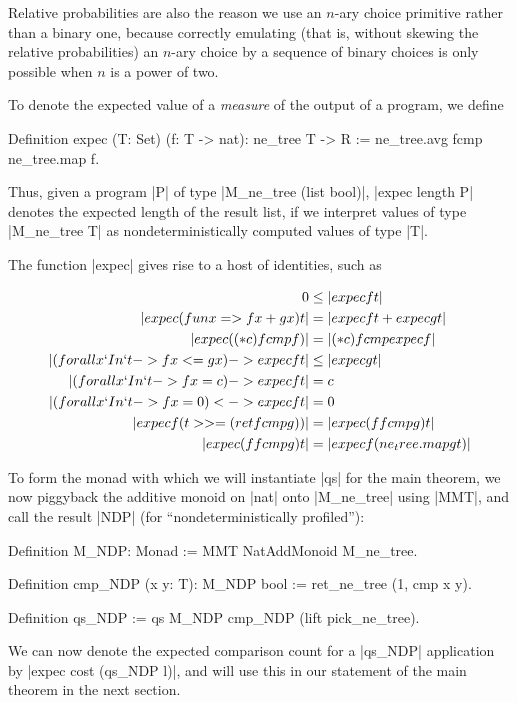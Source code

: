 \documentclass[runningheads]{llncs}
\begin{document}
Relative probabilities are also the reason we use an $n$-ary choice primitive rather than a binary one, because correctly emulating (that is, without skewing the relative probabilities) an $n$-ary choice by a sequence of binary choices is only possible when $n$ is a power of two.

To denote the expected value of a \emph{measure} of the output of a program, we define

\begin{code}
  Definition expec (T: Set) (f: T -> nat): ne_tree T -> R
    := ne_tree.avg fcmp ne_tree.map f.
\end{code}

Thus, given a program |P| of type |M_ne_tree (list bool)|, |expec length P| denotes the expected length of the result list, if we interpret values of type |M_ne_tree T| as nondeterministically computed values of type |T|.

The function |expec| gives rise to a host of identities, such as

\begin{align}
  0 &\le |expec f t| \nonumber \\
  |expec (fun x => f x + g x) t| &= |expec f t + expec g t| \nonumber \\
  |expec ((* c) fcmp f)| &= |(* c) fcmp expec f| \nonumber \\
  |(forall x `In` t -> f x <= g x) -> expec f t| &\le |expec g t| \nonumber \\
  |(forall x `In` t -> f x = c) -> expec f t| &= c \nonumber \\
  |(forall x `In` t -> f x = 0) <-> expec f t| &= 0 \nonumber \\
  |expec f (t >>= (ret fcmp g))| &= |expec (f fcmp g) t| \nonumber \\
  |expec (f fcmp g) t| &= |expec f (ne_tree.map g t)| \label{expec_bind_lem}
\end{align}

To form the monad with which we will instantiate |qs| for the main theorem, we now piggyback the additive monoid on |nat| onto |M_ne_tree| using |MMT|, and call the result |NDP| (for ``nondeterministically profiled''):
\begin{code}
  Definition M_NDP: Monad := MMT NatAddMonoid M_ne_tree.

  Definition cmp_NDP (x y: T): M_NDP bool := ret_ne_tree (1, cmp x y).

  Definition qs_NDP := qs M_NDP cmp_NDP (lift pick_ne_tree).
\end{code}
We can now denote the expected comparison count for a |qs_NDP| application by |expec cost (qs_NDP l)|, and will use this in our statement of the main theorem in the next section.
\end{document}
